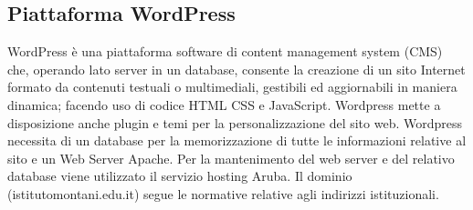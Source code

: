 \documentclass{article}
\begin{document}
	\subsection{\textbf{Piattaforma WordPress}}
	WordPress è una piattaforma software di content management system (CMS) che, operando lato server in un database, consente la creazione di un sito Internet formato da contenuti testuali o multimediali, gestibili ed aggiornabili in maniera dinamica; facendo uso di codice HTML CSS e JavaScript. Wordpress mette a disposizione anche plugin e temi per la personalizzazione del sito web. Wordpress necessita di un database per la memorizzazione di tutte le informazioni relative al sito e un Web Server Apache. Per la mantenimento del web server e del relativo database viene utilizzato il servizio hosting Aruba. Il dominio (istitutomontani.edu.it) segue le normative relative agli indirizzi istituzionali.	
	
\end{document}
